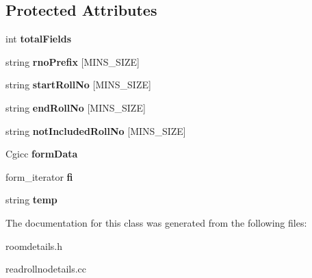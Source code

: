\subsection*{Protected Attributes}
\begin{DoxyCompactItemize}
\item 
\hypertarget{classReadRollNoDetails_a9e3da16b31935dc91fec7c5c9fe5b0b1}{int {\bfseries total\-Fields}}\label{classReadRollNoDetails_a9e3da16b31935dc91fec7c5c9fe5b0b1}

\item 
\hypertarget{classReadRollNoDetails_a3ce491bf8fbdc887b3fc2c1d9bab03f6}{string {\bfseries rno\-Prefix} \mbox{[}M\-I\-N\-S\-\_\-\-S\-I\-Z\-E\mbox{]}}\label{classReadRollNoDetails_a3ce491bf8fbdc887b3fc2c1d9bab03f6}

\item 
\hypertarget{classReadRollNoDetails_a40301d363dead62c878a501f6cc13f3c}{string {\bfseries start\-Roll\-No} \mbox{[}M\-I\-N\-S\-\_\-\-S\-I\-Z\-E\mbox{]}}\label{classReadRollNoDetails_a40301d363dead62c878a501f6cc13f3c}

\item 
\hypertarget{classReadRollNoDetails_a165f0453148ac33fc3d42a0749c1e3d2}{string {\bfseries end\-Roll\-No} \mbox{[}M\-I\-N\-S\-\_\-\-S\-I\-Z\-E\mbox{]}}\label{classReadRollNoDetails_a165f0453148ac33fc3d42a0749c1e3d2}

\item 
\hypertarget{classReadRollNoDetails_add8c46be1edcce9f5d03d0a738d90682}{string {\bfseries not\-Included\-Roll\-No} \mbox{[}M\-I\-N\-S\-\_\-\-S\-I\-Z\-E\mbox{]}}\label{classReadRollNoDetails_add8c46be1edcce9f5d03d0a738d90682}

\item 
\hypertarget{classReadRollNoDetails_ac821611109cf5b331fa827c6c0814176}{Cgicc {\bfseries form\-Data}}\label{classReadRollNoDetails_ac821611109cf5b331fa827c6c0814176}

\item 
\hypertarget{classReadRollNoDetails_a993462dcd9f13d5ab4d0ac41ce58c2c0}{form\-\_\-iterator {\bfseries fi}}\label{classReadRollNoDetails_a993462dcd9f13d5ab4d0ac41ce58c2c0}

\item 
\hypertarget{classReadRollNoDetails_ad362d259f2383fa1c0ee6aef9399b613}{string {\bfseries temp}}\label{classReadRollNoDetails_ad362d259f2383fa1c0ee6aef9399b613}

\end{DoxyCompactItemize}


The documentation for this class was generated from the following files\-:\begin{DoxyCompactItemize}
\item 
roomdetails.\-h\item 
readrollnodetails.\-cc\end{DoxyCompactItemize}

